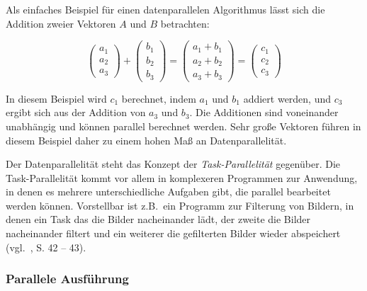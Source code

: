 Als einfaches Beispiel für einen datenparallelen Algorithmus lässt sich die Addition zweier Vektoren $A$ und $B$
betrachten:

\begin{equation*}
    \left(
        \begin{array}{c}
            a_1\\
            a_2\\
            a_3
        \end{array}
    \right)
    +
    \left(
        \begin{array}{c}
            b_1\\
            b_2\\
            b_3
        \end{array}
    \right)
    =
    \left(
        \begin{array}{c}
            a_1 + b_1 \\
            a_2 + b_2 \\
            a_3 + b_3
        \end{array}
    \right)
    =
    \left(
        \begin{array}{c}
            c_1 \\
            c_2 \\
            c_3
        \end{array}
    \right)
\end{equation*}

In diesem Beispiel wird $c_1$ berechnet, indem $a_1$ und $b_1$ addiert werden, und $c_3$ ergibt sich aus der Addition
von $a_3$ und $b_3$. Die Additionen sind voneinander unabhängig und können parallel berechnet werden. Sehr große
Vektoren führen in diesem Beispiel daher zu einem hohen Maß an Datenparallelität.

Der Datenparallelität steht das Konzept der \textit{Task-Parallelität} gegenüber. Die Task-Parallelität kommt vor allem
in komplexeren Programmen zur Anwendung, in denen es mehrere unterschiedliche Aufgaben gibt, die parallel bearbeitet
werden können. Vorstellbar ist z.B.\ ein Programm zur Filterung von Bildern, in denen ein Task das die Bilder
nacheinander lädt, der zweite die Bilder nacheinander filtert und ein weiterer die gefilterten Bilder wieder
abspeichert (vgl.~\cite{kirkhwu}, S. 42 -- 43).

\subsubsection{Parallele Ausführung}

